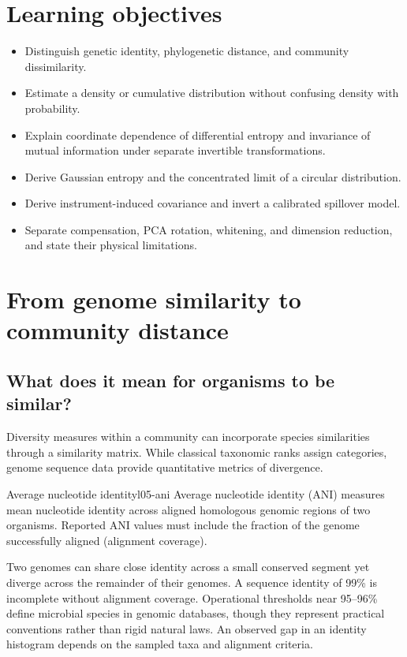 \section*{Learning objectives}
\begin{itemize}
\item Distinguish genetic identity, phylogenetic distance, and community dissimilarity.
\item Estimate a density or cumulative distribution without confusing density with probability.
\item Explain coordinate dependence of differential entropy and invariance of mutual information under separate invertible transformations.
\item Derive Gaussian entropy and the concentrated limit of a circular distribution.
\item Derive instrument-induced covariance and invert a calibrated spillover model.
\item Separate compensation, PCA rotation, whitening, and dimension reduction, and state their physical limitations.
\end{itemize}

\section{From genome similarity to community distance}
\label{sec:l05-phylogeny}
\subsection{What does it mean for organisms to be similar?}
\label{subsec:l05-ani}
Diversity measures within a community can incorporate species similarities through a similarity matrix. While classical taxonomic ranks assign categories, genome sequence data provide quantitative metrics of divergence.

\begin{definition}{Average nucleotide identity}{l05-ani}
Average nucleotide identity (ANI) measures mean nucleotide identity across aligned homologous genomic regions of two organisms. Reported ANI values must include the fraction of the genome successfully aligned (alignment coverage).
\end{definition}
Two genomes can share close identity across a small conserved segment yet diverge across the remainder of their genomes. A sequence identity of 99\% is incomplete without alignment coverage. Operational thresholds near 95--96\% define microbial species in genomic databases, though they represent practical conventions rather than rigid natural laws. An observed gap in an identity histogram depends on the sampled taxa and alignment criteria.

